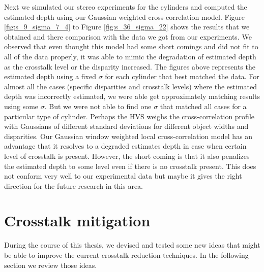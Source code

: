 Next we simulated our stereo experiments for the cylinders and computed the estimated depth using our Gaussian weighted cross-correlation model. Figure \ref{fig:s_9_sigma_7_4} to Figure \ref{fig:s_36_sigma_22} shows the results that we obtained and there comparison with the data we got from our experiments. We observed that even thought this model had some short comings and did not fit to all of the data properly, it was able to mimic the degradation of estimated depth as the crosstalk level or the disparity increased. The figures above represents the estimated depth using a fixed $\sigma$ for each cylinder that best matched the data. For almost all the cases (specific disparities and crosstalk levels) where the estimated depth was incorrectly estimated, we were able get approximately matching results using some $\sigma$. But we were not able to find one $\sigma$ that matched all cases for a particular type of cylinder. Perhaps the HVS weighs the cross-correlation profile with Gaussians of different standard deviations for different object widths and disparities. Our Gaussian window weighted local cross-correlation model has an advantage that it resolves to a degraded estimates depth in case when certain level of crosstalk is present. However, the short coming is that it also penalizes the estimated depth to some level even if there is no crosstalk present. This does not conform very well to our experimental data but maybe it gives the right direction for the future research in this area.
\pagebreak

\section{Crosstalk mitigation}

During the course of this thesis, we devised and tested some new ideas that might be able to improve the current crosstalk reduction techniques. In the following section we review those ideas.

